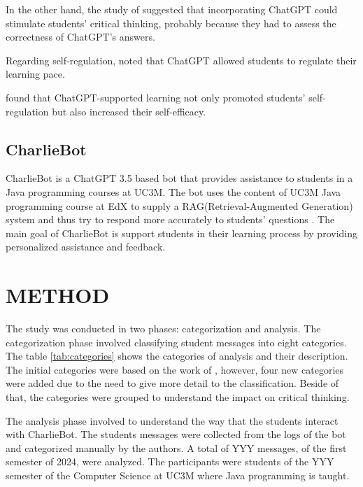 \documentclass[a4paper,twoside]{article}
\begin{document}
In the other hand, the study of \cite{zhang24} suggested that incorporating
ChatGPT could stimulate students' critical thinking, probably because they
had to assess the correctness of ChatGPT's answers.

Regarding self-regulation, \cite{cai23} noted that ChatGPT allowed students to
regulate their learning pace.

\cite{wu24} found that ChatGPT-supported learning not only promoted students'
self-regulation but also increased their self-efficacy.

\subsection{CharlieBot}

CharlieBot is a ChatGPT 3.5 based bot that provides assistance to students in a
Java programming courses at UC3M. The bot uses the content of UC3M Java
programming course at EdX to supply a RAG(Retrieval-Augmented Generation) system
and thus try to respond more accurately to students' questions \cite{Sun24}. The
main goal of CharlieBot is support students in their learning process by
providing personalized assistance and feedback.

\section{\uppercase{Method}}

The study was conducted in two phases: categorization and analysis. The
categorization phase involved classifying student messages into eight
categories. The table \ref{tab:categories} shows the categories of analysis and
their description. The initial categories were based on the work of
\cite{Ghimire24}, however, four new categories were added due to the need to
give more detail to the classification. Beside of that, the categories were
grouped to understand the impact on critical thinking.

The analysis phase involved to understand the way that the students interact
with CharlieBot. The students messages were collected from the logs of the bot
and categorized manually by the authors. A total of YYY messages, of the first
semester of 2024, were analyzed. The participants were students of the YYY
semester of the Computer Science at UC3M where Java programming is taught.
\end{document}
